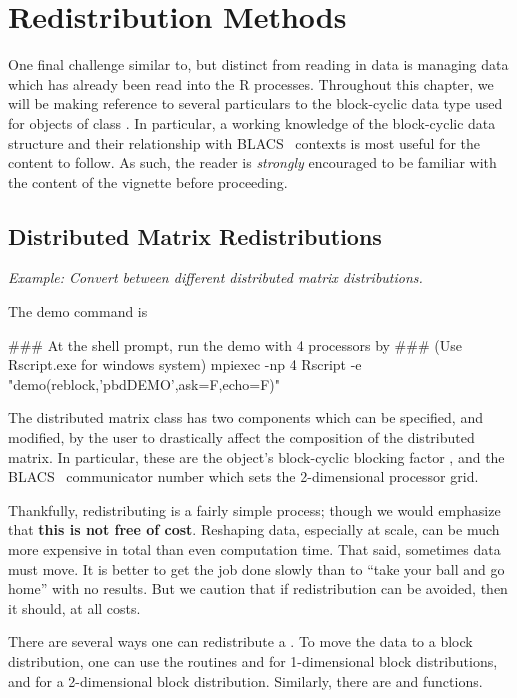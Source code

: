 \chapter{Redistribution Methods}
\label{sec:redist}

One final challenge similar to, but distinct from reading in data is managing data which has already been read into the R processes.  Throughout this chapter, we will be making reference to several particulars to the block-cyclic data type used for objects of
class .
In particular, a working knowledge of the block-cyclic data structure and their relationship with BLACS~ contexts is most useful for the content to follow.  As such, the reader is \emph{strongly} encouraged to be familiar with the content of the  vignette before proceeding.

\section{Distributed Matrix Redistributions}
\label{sec:dmatredist}

\emph{Example:  Convert between different distributed matrix distributions.}

The demo command is
\begin{Command}
### At the shell prompt, run the demo with 4 processors by
### (Use Rscript.exe for windows system)
mpiexec -np 4 Rscript -e "demo(reblock,'pbdDEMO',ask=F,echo=F)"
\end{Command}

The distributed matrix class 
has two components which can be specified, and modified, by the user to 
drastically affect the composition of the distributed matrix.  In particular, 
these are the object's block-cyclic blocking factor , and the 
BLACS~ communicator number  which sets the 
2-dimensional processor grid. 

Thankfully, redistributing is a fairly simple process; though we would emphasize 
that \textbf{this is not free of cost}.  Reshaping data, especially at scale, 
can be much more expensive in total than even computation time.  That said, 
sometimes data must move.  It is better to get the job done slowly than to 
``take your ball and go home'' with no results.  But we caution that if 
redistribution can be avoided, then it should, at all costs.

There are several ways one can redistribute a .  To move the 
data to a block distribution, one can use the routines  and 
 for 1-dimensional block distributions, and 
 for a 2-dimensional block distribution.  Similarly, there are 
 and  functions.  

